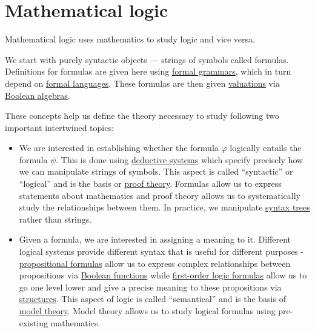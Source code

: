 \section{Mathematical logic}\label{sec:mathematical_logic}

Mathematical logic uses mathematics to study logic and vice versa.

We start with purely syntactic objects --- strings of symbols called formulas. Definitions for formulas are given here using \hyperref[def:formal_grammar]{formal grammars}, which in turn depend on \hyperref[def:formal_language]{formal languages}. These formulas are then given \hyperref[def:first_order_valuation/formula_valuation]{valuations} via \hyperref[def:boolean_algebra]{Boolean algebras}.

These concepts help us define the theory necessary to study following two important intertwined topics:
\begin{itemize}
  \item We are interested in establishing whether the formula \( \varphi \) logically entails the formula \( \psi \). This is done using \hyperref[def:deductive_system]{deductive systems} which specify precisely how we can manipulate strings of symbols. This aspect is called \enquote{syntactic} or \enquote{logical} and is the basis or \hyperref[def:proof_derivability]{proof theory}. Formulas allow us to express statements about mathematics and proof theory allows us to systematically study the relationships between them. In practice, we manipulate \hyperref[rem:abstract_syntax_tree]{syntax trees} rather than strings.

  \item Given a formula, we are interested in assigning a meaning to it. Different logical systems provide different syntax that is useful for different purposes - \hyperref[def:propositional_syntax/formula]{propositional formulas} allow us to express complex relationships between propositions via \hyperref[subsec:boolean_functions]{Boolean functions} while \hyperref[def:first_order_syntax/formula]{first-order logic formulas} allow us to go one level lower and give a precise meaning to these propositions via \hyperref[def:first_order_structure]{structures}. This aspect of logic is called \enquote{semantical} and is the basis of \hyperref[subsec:first_order_models]{model theory}. Model theory allows us to study logical formulas using pre-existing mathematics.
\end{itemize}


